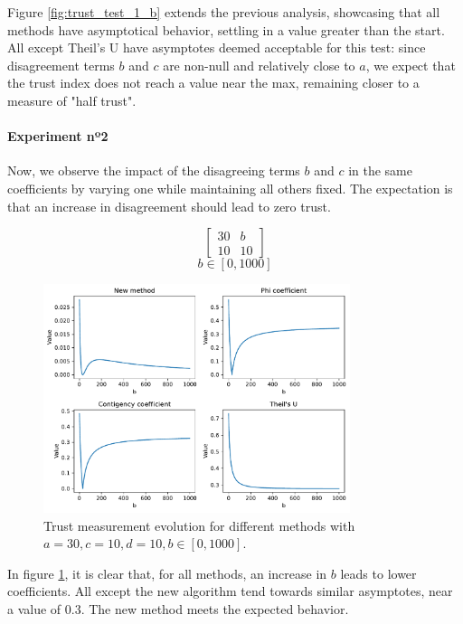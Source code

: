Figure \ref{fig:trust_test_1_b} extends the previous analysis, showcasing that all methods have asymptotical behavior, settling in a value greater than the start. All except Theil's U have asymptotes deemed acceptable for this test: since disagreement terms $b$ and $c$ are non-null and relatively close to $a$, we expect that the trust index does not reach a value near the max, remaining closer to a measure of "half trust".

\paragraph{Experiment nº2} Now, we observe the impact of the disagreeing terms $b$ and $c$ in the same coefficients by varying one while maintaining all others fixed. The expectation is that an increase in disagreement should lead to zero trust.

$$
\begin{bmatrix}
    30 & b \\ 10 & 10
\end{bmatrix}
$$
$$
b \in [0, 1000]
$$
\begin{figure}[h!]
\centering
    \includegraphics[width=0.8\textwidth]{figures/chapter4/cell/trust_tests/2_a.pdf}
    \caption{Trust measurement evolution for different methods with $a=30, c=10, d=10, b \in [0, 1000]$.}
    \label{fig:trust_test_2_a}
\end{figure}
\FloatBarrier

In figure \ref{fig:trust_test_2_a}, it is clear that, for all methods, an increase in $b$ leads to lower coefficients. All except the new algorithm tend towards similar asymptotes, near a value of 0.3. The new method meets the expected behavior.

